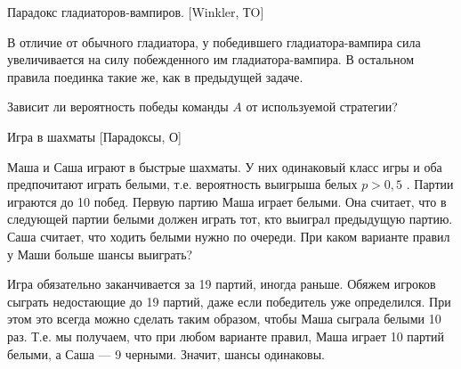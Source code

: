 \begin{problem}
 Парадокс гладиаторов-вампиров. [Winkler, ТO]\par
В отличие от обычного гладиатора, у победившего гладиатора-вампира сила увеличивается на силу побежденного им гладиатора-вампира. В остальном правила поединка такие же, как в предыдущей задаче.\par
Зависит ли вероятность победы команды  $A$  от используемой стратегии?\par



\begin{sol}

\end{sol}
\end{problem}





\begin{problem}
 Игра в шахматы [Парадоксы, О]\par
Маша и Саша играют в быстрые шахматы. У них одинаковый класс игры и оба предпочитают играть белыми, т.е. вероятность выигрыша белых  $p>0,5$ . Партии играются до 10 побед. Первую партию Маша играет белыми. Она считает, что в следующей партии белыми должен играть тот, кто выиграл предыдущую партию. Саша считает, что ходить белыми нужно по очереди. При каком варианте правил у Маши больше шансы выиграть?\par



\begin{sol}
Игра обязательно заканчивается за 19 партий, иногда раньше. Обяжем игроков сыграть недостающие до 19 партий, даже если победитель уже определился. При этом это всегда можно сделать таким образом, чтобы Маша сыграла белыми 10 раз. Т.е. мы получаем, что при любом варианте правил, Маша играет 10 партий белыми, а Саша — 9 черными. Значит, шансы одинаковы.
\end{sol}
\end{problem}




